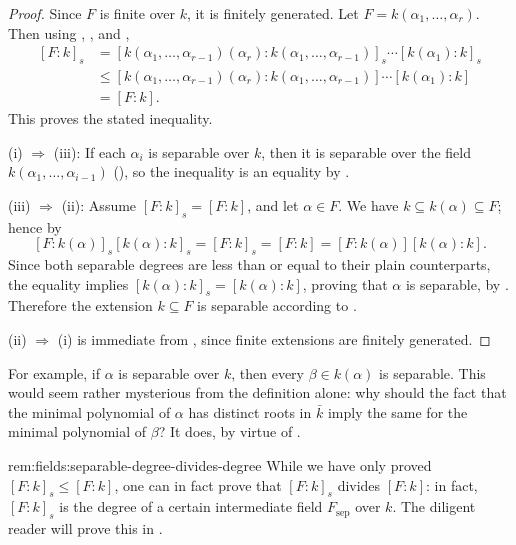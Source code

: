 \begin{proof}
  Since $F$ is finite over $k$, it is finitely generated. Let
  $F = k(\alpha_1, \dots, \alpha_r)$. Then using
  , , and
  ,
  \begin{align*} {[F : k]}_s &= {[k(\alpha_1, \dots,
      \alpha_{r-1})(\alpha_r) : k(\alpha_1, \dots, \alpha_{r-1})]}_s
                               \cdots [k(\alpha_1) : k]_s \\
                             &\leq [k(\alpha_1, \dots,
                               \alpha_{r-1})(\alpha_r) : k(\alpha_1,
                               \dots, \alpha_{r-1})]
                               \cdots [k(\alpha_1) : k] \\
                             &= [F : k].
  \end{align*}
  This proves the stated inequality.

  (i) $\Rightarrow$ (iii): If each $\alpha_i$ is separable over $k$,
  then it is separable over the field
  $k(\alpha_1, \dots, \alpha_{i-1})$
  (),
  so the inequality is an equality by .

  (iii) $\Rightarrow$ (ii): Assume $[F : k]_s = [F : k]$, and let
  $\alpha \in F$. We have $k \subseteq k(\alpha) \subseteq F$; hence
  by 
  \[ [F : k(\alpha)]_s [k(\alpha) : k]_s = [F : k]_s = [F : k] = [F :
    k(\alpha)][k(\alpha) : k].
  \]
  Since both separable degrees are less than or equal to their plain
  counterparts, the equality implies
  $[k(\alpha) : k]_s = [k(\alpha) : k]$, proving that $\alpha$ is
  separable, by . Therefore the extension
  $k \subseteq F$ is separable according to .

  (ii) $\Rightarrow$ (i) is immediate from ,
  since finite extensions are finitely generated.
\end{proof}
For example, if $\alpha$ is separable over $k$, then every
$\beta \in k(\alpha)$ is separable. This would seem rather mysterious
from the definition alone: why should the fact that the minimal
polynomial of $\alpha$ has distinct roots in $\bar{k}$ imply the same
for the minimal polynomial of $\beta$? It does, by virtue of
.
\begin{rem}{}{rem:fields:separable-degree-divides-degree}
  While we have only proved $[F : k]_s \leq [F : k]$, one can in fact
  prove that $[F : k]_s$ divides $[F : k]$: in fact, $[F : k]_s$ is
  the degree of a certain intermediate field $F_{\mathrm{sep}}$ over
  $k$. The diligent reader will prove this in
  .
\end{rem}

